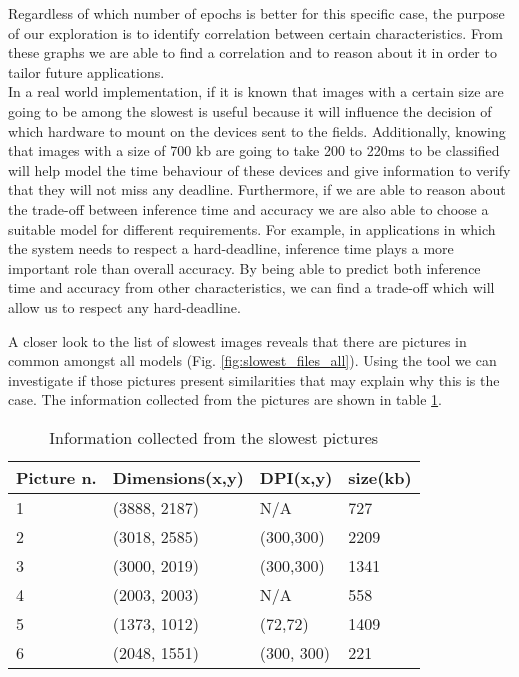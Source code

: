 Regardless of which number of epochs is better for this specific case, the purpose of our exploration is to identify correlation between certain characteristics. From these graphs we are able to find a correlation and to reason about it in order to tailor future applications. \\
In a real world implementation, if it is known that images with a certain size are going to be among the slowest is useful because it will influence the decision of which hardware to mount on the devices sent to the fields. Additionally, knowing that images with a size of 700 kb are going to take 200 to 220ms to be classified will help model the time behaviour of these devices and give information to verify that they will not miss any deadline. Furthermore, if we are able to reason about the trade-off between inference time and accuracy we are also able to choose a suitable model for different requirements. For example, in applications in which the system needs to respect a hard-deadline, inference time plays a more important role than overall accuracy. By being able to predict both inference time and accuracy from other characteristics, we can find a trade-off which will allow us to respect any hard-deadline. 


A closer look to the list of slowest images reveals that there are pictures in common amongst all models (Fig. \ref{fig:slowest_files_all}). Using the tool we can investigate if those pictures present similarities that may explain why this is the case. The information collected from the pictures are shown in table 
\ref{tab:pictures_info}.

\begin{table}[htbp]
\centering
\begin{tabular}{ p{2cm} p{4cm}  p{2cm}  p{2cm}  }
 Picture n.& Dimensions(x,y) & DPI(x,y)&size(kb) \\
 \hline
1&(3888, 2187)&N/A& 727\\
2&(3018, 2585)&(300,300)&2209\\
3&(3000, 2019)&(300,300)&1341\\
4&(2003, 2003)&N/A&558\\
5&(1373, 1012)&(72,72)&1409\\
6&(2048, 1551)&(300, 300)&221\\
 \hline
\end{tabular}
\caption{Information collected from the slowest pictures}
\label{tab:pictures_info}
\end{table}

